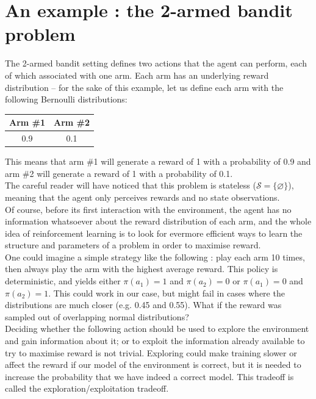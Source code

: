\section{An example : the 2-armed bandit problem}
The 2-armed bandit setting defines two actions that the agent can perform,
each of which associated with one arm. Each arm has an underlying reward
distribution -- for the sake of this example, let us define each arm with the
following Bernoulli distributions: 

\begin{table}[H]
	\centering
	\begin{tabular}{c|c}
		Arm \#1 & Arm \#2 \\ \hline
		0.9 & 0.1
	\end{tabular}
\end{table}

\noindent This means that arm \#1 will generate a reward of 1 with a probability
of 0.9 and arm \#2 will generate a reward of 1 with a probability of 0.1.\\

The careful reader will have noticed that this problem is stateless 
($\mathcal{S} = \{\varnothing\}$), meaning that the agent only perceives
rewards and no state observations.\\

Of course, before its first interaction with the environment, the agent has no
information whatsoever about the reward distribution of each arm, and the whole
idea of reinforcement learning is to look for evermore efficient ways to learn
the structure and parameters of a problem in order to maximise reward.\\

One could imagine a simple strategy like the following : play each arm 10 times,
then always play the arm with the highest average reward. This policy is
deterministic, and yields either $ \pi(a_1) = 1$ and $\pi(a_2) = 0$ or
$\pi(a_1) = 0$ and $\pi(a_2) = 1$. This could work in
our case, but might fail in cases where the distributions are much closer
(e.g. 0.45 and 0.55). What if the reward was sampled out of overlapping normal
distributions?\\

Deciding whether the following action should be used to explore the environment
and gain information about it; or to exploit the information already available
to try to maximise reward is not trivial. Exploring could make training slower
or affect the reward if our model of the environment is correct, but it is 
needed to increase the probability that we have indeed a correct model. This
tradeoff is called the exploration/exploitation tradeoff. 



